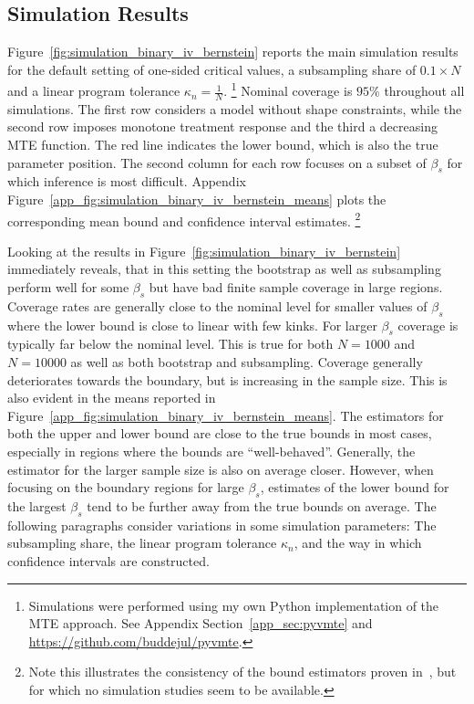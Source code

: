 \documentclass[12pt,a4paper,english]{article} %
\numberwithin{equation}{section}
\theoremstyle{definition}
\theoremstyle{remark}
\theoremstyle{plain}
\begin{document}
\subsection{Simulation Results}
Figure~\ref{fig:simulation_binary_iv_bernstein} reports the main simulation results for the default setting of one-sided critical values,  a subsampling share of $0.1\times N$ and a linear program tolerance $\kappa_n = \frac{1}{N}$.
\footnote{Simulations were performed using my own Python implementation of the MTE approach. See Appendix Section~\ref{app_sec:pyvmte} and \url{https://github.com/buddejul/pyvmte}.}
Nominal coverage is $95$\% throughout all simulations. The first row considers a model without shape constraints, while the second row imposes monotone treatment response and the third a decreasing MTE function.
The red line indicates the lower bound, which is also the true parameter position.
The second column for each row focuses on a subset of $\beta_s$ for which inference is most difficult.
Appendix Figure~\ref{app_fig:simulation_binary_iv_bernstein_means} plots the corresponding mean bound and confidence interval estimates.
\footnote{Note this illustrates the consistency of the bound estimators proven in~\cite{mogstad2018using}, but for which no simulation studies seem to be available.}

Looking at the results in Figure~\ref{fig:simulation_binary_iv_bernstein} immediately reveals, that in this setting the bootstrap as well as subsampling perform well for some $\beta_s$ but have bad finite sample coverage in large regions.
Coverage rates are generally close to the nominal level for smaller values of $\beta_s$ where the lower bound is close to linear with few kinks.
For larger $\beta_s$ coverage is typically far below the nominal level. This is true for both $N=1000$ and $N=10000$ as well as both bootstrap and subsampling.
Coverage generally deteriorates towards the boundary, but is increasing in the sample size.
This is also evident in the means reported in Figure~\ref{app_fig:simulation_binary_iv_bernstein_means}.
The estimators for both the upper and lower bound are close to the true bounds in most cases, especially in regions where the bounds are ``well-behaved''.
Generally, the estimator for the larger sample size is also on average closer.
However, when focusing on the boundary regions for large $\beta_s$, estimates of the lower bound for the largest $\beta_s$ tend to be further away from the true bounds on average.
The following paragraphs consider variations in some simulation parameters: The subsampling share, the linear program tolerance $\kappa_n$, and the way in which confidence intervals are constructed.
\end{document}
